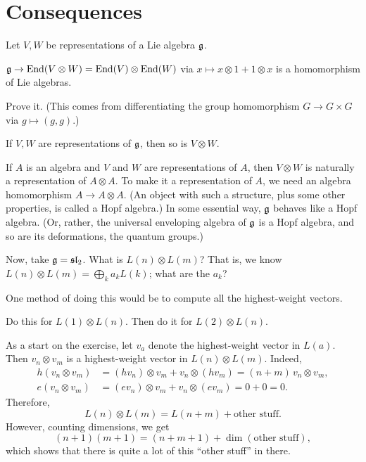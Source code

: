 \section{Consequences}

Let $V, W$ be representations of a Lie algebra $\mathfrak{g}$.

\begin{claim}
$\mathfrak{g} \to \operatorname{End}(V \otimes W) = \operatorname{End}(V) \otimes \operatorname{End}(W)$ via
$x \mapsto x \otimes 1 + 1 \otimes x$ is a homomorphism of Lie algebras.
\end{claim}

\begin{exercise}
Prove it. (This comes from differentiating the group homomorphism
$G \to G \times G$ via $g \mapsto (g, g)$.)
\end{exercise}

\begin{corollary}
If $V, W$ are representations of $\mathfrak{g}$, then so is $V \otimes W$.
\end{corollary}

\begin{remark}
If $A$ is an algebra and $V$ and $W$ are representations of $A$, then
$V \otimes W$ is naturally a representation of $A \otimes A$. To make it a
representation of $A$, we need an algebra homomorphism $A \to A \otimes A$.
(An object with such a structure, plus some other properties, is called a Hopf
algebra.) In some essential way, $\mathfrak{g}$ behaves like a Hopf algebra. (Or,
rather, the universal enveloping algebra of $\mathfrak{g}$ is a Hopf algebra, and so are
its deformations, the quantum groups.)
\end{remark}

Now, take $\mathfrak{g} = \mathfrak{sl}_2$. What is $L(n) \otimes L(m)$? That is, we know
$L(n) \otimes L(m) = \bigoplus_k a_kL(k)$; what are the $a_k$?

One method of doing this would be to compute all the highest-weight vectors.

\begin{exercise}
Do this for $L(1) \otimes L(n)$. Then do it for $L(2) \otimes L(n)$.
\end{exercise}

As a start on the exercise, let $v_a$ denote the highest-weight vector in
$L(a)$. Then $v_n \otimes v_m$ is a highest-weight vector in
$L(n) \otimes L(m)$. Indeed,
\begin{align*}
  h(v_n \otimes v_m) &= (hv_n) \otimes v_m + v_n \otimes (hv_m) = (n + m)\,v_n \otimes v_m,\\
  e(v_n \otimes v_m) &= (ev_n) \otimes v_m + v_n \otimes (ev_m) = 0 + 0 = 0.
\end{align*}
Therefore,
\[
  L(n) \otimes L(m) = L(n + m) + \text{other stuff}.
\]
However, counting dimensions, we get
\[
  (n + 1)(m + 1) = (n + m + 1) + \dim(\text{other stuff}),
\]
which shows that there is quite a lot of this ``other stuff'' in there.

